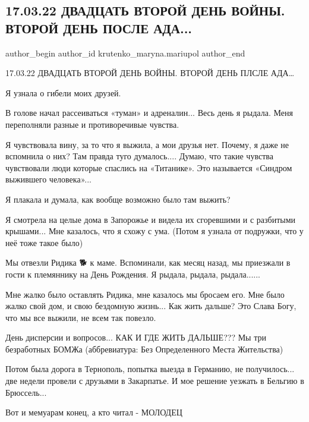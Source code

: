  
 
 
 
 

\subsection{17.03.22 ДВАДЦАТЬ ВТОРОЙ ДЕНЬ ВОЙНЫ. ВТОРОЙ ДЕНЬ ПОСЛЕ АДА...}
\label{sec:17_03_2023.fb.krutenko_maryna.mariupol.1.17_03_22_dvadtsat_vt}

\ifcmt
 author_begin
   author_id krutenko_maryna.mariupol
 author_end
\fi

17.03.22 ДВАДЦАТЬ ВТОРОЙ ДЕНЬ ВОЙНЫ. ВТОРОЙ ДЕНЬ ПЛСЛЕ АДА…

Я узнала о гибели моих друзей.

В голове начал рассеиваться «туман» и адреналин... Весь день я рыдала. Меня
переполняли разные и противоречивые чувства. 

Я чувствовала вину, за то что я выжила, а мои друзья нет. Почему, я даже не
вспомнила о них? Там правда туго думалось.... Думаю, что такие чувства
чувствовали люди которые спаслись на «Титанике». Это называется «Синдром
выжившего человека»...

Я плакала и думала, как вообще возможно было там выжить? 

Я смотрела на целые дома в Запорожье и видела их сгоревшими и с разбитыми
крышами... Мне казалось, что я схожу с ума. (Потом я узнала от подружки, что у
неё тоже такое было)

Мы отвезли Ридика 🐕 к маме. Вспоминали, как месяц назад, мы приезжали в гости
к племяннику на День Рождения. Я рыдала, рыдала, рыдала......

Мне жалко было оставлять Ридика, мне казалось мы бросаем его. Мне было жалко
свой дом, и свою бездомную жизнь... Как жить дальше? Это Слава Богу, что мы все
выжили, не всем так повезло. 

День дисперсии и вопросов... КАК И ГДЕ ЖИТЬ ДАЛЬШЕ??? Мы три безработных БОМЖа
(аббревиатура: Без Определенного Места Жительства)

Потом была дорога в Тернополь, попытка выезда в Германию, не получилось... две
недели провели с друзьями в Закарпатье. И мое решение уезжать в Бельгию в
Брюссель...

Вот и мемуарам конец, а кто читал - МОЛОДЕЦ
